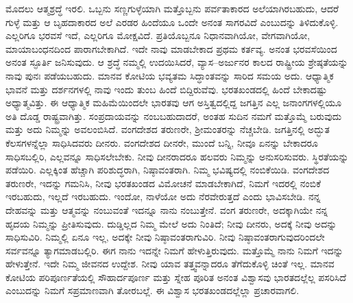 ಮೊದಲು ಆತ್ಮಶ್ರದ್ಧೆ ಇರಲಿ. ಒಬ್ಬನು ಸಣ್ಣಗುಳ್ಳೆಯಾಗಿ ಮತ್ತೊಬ್ಬನು ಪರ್ವತಾಕಾರದ ಅಲೆಯಾಗಿರಬಹುದು, ಆದರೆ ಗುಳ್ಳೆ ಮತ್ತು ಆ ಬೃಹದಾಕಾರದ ಅಲೆ ಎರಡರ ಹಿಂದೆಯೂ ಒಂದೇ ಅನಂತ ಸಾಗರವಿದೆ ಎಂಬುದನ್ನು ತಿಳಿದುಕೊಳ್ಳಿ. ಎಲ್ಲರಿಗೂ ಭರವಸೆ ಇದೆ, ಎಲ್ಲರಿಗೂ ಮೋಕ್ಷವಿದೆ. ಪ್ರತಿಯೊಬ್ಬನೂ ನಿಧಾನವಾಗಿಯೋ, ವೇಗವಾಗಿಯೋ, ಮಾಯಾಬಂಧನದಿಂದ ಪಾರಾಗಬೇಕಾಗಿದೆ. ಇದೇ ನಾವು ಮಾಡಬೇಕಾದ ಪ್ರಥಮ ಕರ್ತವ್ಯ. ಅನಂತ ಭರವಸೆಯಿಂದ ಅನಂತ ಸ್ಫೂರ್ತಿ ಜನಿಸುವುದು. ಆ ಶ್ರದ್ಧೆ ನಮ್ಮಲ್ಲಿ ಉದಯಿಸಿದರೆ, ವ್ಯಾಸ–ಅರ್ಜುನರ ಕಾಲದ ರಾಷ್ಟ್ರೀಯ ಶ್ರೇಷ್ಠತೆಯನ್ನು ನಾವು ಪುನಃ ಪಡೆಯಬಹುದು. ಮಾನವ ಕೋಟಿಯ ಭವ್ಯತಮ ಸಿದ್ಧಾಂತವನ್ನು ಸಾರಿದ ಸಮಯ ಅದು. ಆಧ್ಯಾತ್ಮಿಕ ಭಾವನೆ ಮತ್ತು ದರ್ಶನಗಳಲ್ಲಿ ನಾವು ಇಂದು ತುಂಬ ಹಿಂದೆ ಬಿದ್ದಿರುವೆವು. ಭರತಖಂಡದಲ್ಲಿ ಹಿಂದೆ ಬೇಕಾದಷ್ಟು ಅಧ್ಯಾತ್ಮವಿತ್ತು. ಈ ಆಧ್ಯಾತ್ಮಿಕ ಮಹಿಮೆಯಿಂದಲೇ ಭಾರತವು ಆಗ ಅಸ್ತಿತ್ವದಲ್ಲಿದ್ದ ಜಗತ್ತಿನ ಎಲ್ಲ ಜನಾಂಗಗಳಲ್ಲಿಯೂ ಅತಿ ದೊಡ್ಡ ರಾಷ್ಟ್ರವಾಗಿತ್ತು. ಸಂಪ್ರದಾಯವನ್ನು ನಂಬಬಹುದಾದರೆ, ಅಂತಹ ಸುದಿನ ನಮಗೆ ಮತ್ತೊಮ್ಮೆ ಬರುವುದು ಮತ್ತು ಅದು ನಿಮ್ಮನ್ನು ಅವಲಂಬಿಸಿದೆ. ವಂಗದೇಶದ ತರುಣರೇ, ಶ‍್ರೀಮಂತರನ್ನು ನೆಚ್ಚಬೇಡಿ. ಜಗತ್ತಿನಲ್ಲಿ ಅದ್ಭುತ ಕೆಲಸಗಳನ್ನೆಲ್ಲಾ ಸಾಧಿಸಿದವರು ದೀನರು. ವಂಗದೇಶದ ದೀನರೇ, ಮುಂದೆ ಬನ್ನಿ, ನೀವೂ ಏನನ್ನು ಬೇಕಾದರೂ ಸಾಧಿಸಬಲ್ಲಿರಿ, ಎಲ್ಲವನ್ನೂ ಸಾಧಿಸಲೇಬೇಕು. ನೀವು ದೀನರಾದರೂ ಹಲವರು ನಿಮ್ಮನ್ನು ಅನುಸರಿಸುವರು. ಸ್ಥಿರತೆಯನ್ನು ಪಡೆಯಿರಿ. ಎಲ್ಲಕ್ಕಿಂತ ಹೆಚ್ಚಾಗಿ ಪರಿಶುದ್ಧರಾಗಿ, ನಿಷ್ಠಾವಂತರಾಗಿ. ನಿಮ್ಮ ಭವಿಷ್ಯದಲ್ಲಿ ನಂಬಿಕೆಯಿಡಿ. ವಂಗದೇಶದ ತರುಣರೇ, ಇದನ್ನು ಗಮನಿಸಿ, ನೀವು ಭರತಖಂಡದ ವಿಮೋಚನೆ ಮಾಡಬೇಕಾಗಿದೆ, ನಿಮಗೆ ಇದರಲ್ಲಿ ನಂಬಿಕೆ ಇರಬಹುದು, ಇಲ್ಲದೆ ಇರಬಹುದು. ಇಂದೋ, ನಾಳೆಯೋ ಅದು ನೆರವೇರುತ್ತದೆ ಎಂದು ಭಾವಿಸಬೇಡಿ. ನನ್ನ ದೇಹವನ್ನು ಮತ್ತು ಆತ್ಮವನ್ನು ನಂಬುವಂತೆ ಇದನ್ನೂ ನಾನು ನಂಬುತ್ತೇನೆ. ವಂಗ ತರುಣರೇ, ಅದಕ್ಕಾಗಿಯೇ ನನ್ನ ಹೃದಯ ನಿಮ್ಮನ್ನು ಪ್ರೀತಿಸುವುದು. ದುಡ್ಡಿಲ್ಲದ ನಿಮ್ಮ ಮೇಲೆ ಅದು ನಿಂತಿದೆ; ನೀವು ದೀನರು, ಅದಕ್ಕೆ ನೀವು ಅದನ್ನು ಸಾಧಿಸುವಿರಿ. ನಿಮ್ಮಲ್ಲಿ ಏನೂ ಇಲ್ಲ, ಅದಕ್ಕೇ ನೀವು ನಿಷ್ಠಾವಂತರಾಗುವಿರಿ. ನೀವು ನಿಷ್ಠಾವಂತರಾಗುವುದರಿಂದಲೇ ಸರ್ವವನ್ನೂ ತ್ಯಾಗಮಾಡಬಲ್ಲಿರಿ. ಈಗ ನಾನು ಇದನ್ನೇ ನಿಮಗೆ ಹೇಳುತ್ತಿರುವುದು. ಮತ್ತೊಮ್ಮೆ ನಾನು ನಿಮಗೆ ಇದನ್ನು ಹೇಳುತ್ತೇನೆ. ಇದೇ ನಿಮ್ಮ ಜೀವನದ ಉದ್ದೇಶ. ನೀವು ಯಾವ ತತ್ತ್ವವನ್ನಾದರೂ ತೆಗೆದುಕೊಳ್ಳಿ ಚಿಂತೆ ಇಲ್ಲ. ಮಾನವ ಕೋಟಿಯ ಪರಿಪೂರ್ಣತೆಯಲ್ಲಿ ಸೌಹಾರ್ದಪೂರ್ಣ ಮತ್ತು ಸ್ನೇಹ ಪೂರಿತ ಅನಂತ ವಿಶ್ವಾಸವು ಭಾರತದಲ್ಲೆಲ್ಲ ಪಸರಿಸಿದೆ ಎಂಬುದನ್ನು ನಿಮಗೆ ಸಪ್ರಮಾಣವಾಗಿ ತೋರಬಲ್ಲೆ. ಈ ವಿಶ್ವಾಸ ಭರತಖಂಡದಲ್ಲೆಲ್ಲಾ ಪ್ರಚಾರವಾಗಲಿ. 


